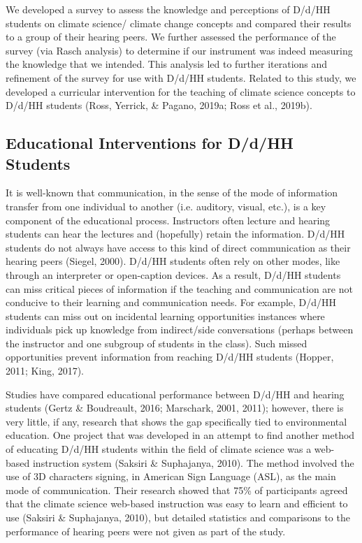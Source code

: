 \documentclass[11.5pt]{sig-alternate} %
\begin{document}
\begin{large}
We developed a survey to assess the knowledge and perceptions of D/d/HH students on climate science/ climate change concepts and compared their results to a group of their hearing peers.  We further assessed the performance of the survey (via Rasch analysis) to determine if our instrument was indeed measuring the knowledge that we intended.  This analysis led to further iterations and refinement of the survey for use with D/d/HH students.  Related to this study, we developed a curricular intervention for the teaching of climate science concepts to D/d/HH students (Ross, Yerrick, \& Pagano, 2019a; Ross et al., 2019b). 

\subsection*{Educational Interventions for D/d/HH Students}

It is well-known that communication, in the sense of the mode of information transfer from one individual to another (i.e. auditory, visual, etc.), is a key component of the educational process.  Instructors often lecture and hearing students can hear the lectures and (hopefully) retain the information.  D/d/HH students do not always have access to this kind of direct communication as their hearing peers (Siegel, 2000). D/d/HH students often rely on other modes, like through an interpreter or open-caption devices. As a result, D/d/HH students can miss critical pieces of information if the teaching and communication are not conducive to their learning and communication needs. For example, D/d/HH students can miss out on incidental learning opportunities instances where individuals pick up knowledge from indirect/side conversations (perhaps between the instructor and one subgroup of students in the class). Such missed opportunities prevent information from reaching D/d/HH students (Hopper, 2011; King, 2017). 

Studies have compared educational performance between D/d/HH and hearing students (Gertz \& Boudreault, 2016; Marschark, 2001, 2011); however, there is very little, if any, research that shows the gap specifically tied to environmental education. One project that was developed in an attempt to find another method of educating D/d/HH students within the field of climate science was a web-based instruction system (Saksiri \& Suphajanya, 2010). The method involved the use of 3D characters signing, in American Sign Language (ASL), as the main mode of communication. Their research showed that 75\% of participants agreed that the climate science web-based instruction was easy to learn and efficient to use (Saksiri \& Suphajanya, 2010), but detailed statistics and comparisons to the performance of hearing peers were not given as part of the study. 


\end{large}
\end{document}
